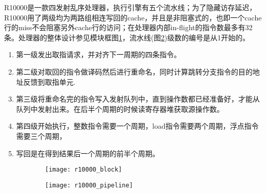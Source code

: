 	R10000是一款四发射乱序处理器，执行引擎有五个流水线；为了隐藏访存延迟，R10000用了两级均为两路组相连写回的cache，并且是非阻塞式的，也即一个cache行的miss不会阻塞另外cache行的访问；在处理器内部in-flight的指令数最多有32条\citep{MIPS1996}。处理器的整体设计参见模块框图\ref{fig:r10000_block}，流水线(图\ref{fig:r10000_pipeline})级数的编号是从1开始的。
	\begin{enumerate}
		\item 第一级发出取指请求，并对齐下一周期的四条指令。
		\item 第二级对取回的指令做译码然后进行重命名，同时计算跳转分支指令的目的地址反馈到取指单元.
		\item 第三级将重命名完的指令写入发射队列中，直到操作数都已经准备好，才能从队列中发射出来。在后半个周期的时候读寄存器堆获取源操作数。
		\item 第四级开始执行，整数指令需要一个周期，load指令需要两个周期，浮点指令需要三个周期，
		\item 写回是在得到结果后一个周期的前半个周期。
	\end{enumerate}
	\begin{figure}[!htbp]
	\centering
	\begin{subfigure}[b]{0.7\textwidth}
		\texttt{[image: r10000\_block]}
		\caption{}
		\label{fig:r10000_block}
	\end{subfigure}
	\begin{subfigure}[b]{0.7\textwidth}
		\texttt{[image: r10000\_pipeline]}
		\caption{}
		\label{fig:r10000_pipeline}
	\end{subfigure}
	\label{fig:r10000_total}
	\end{figure}

